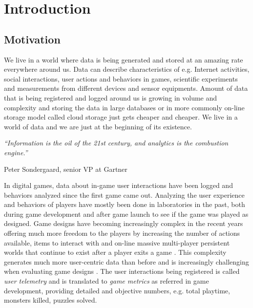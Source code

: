 
\chapter{Introduction} %
\label{Chapter1}

\section{Motivation}
We live in a world where data is being generated and stored at an amazing rate everywhere around us. Data can describe characteristics of e.g. Internet activities, social interactions, user actions and behaviors in games, scientific experiments and measurements from different devices and sensor equipments. Amount of data that is being registered and logged around us is growing in volume and complexity and storing the data in large databases or in more commonly on-line storage model called cloud storage just gets cheaper and cheaper. We live in a world of data and we are just at the beginning of its existence. 

\null
\textit{``Information is the oil of the 21st century, and analytics is the combustion engine.''}

\begin{flushright}
Peter Sondergaard, senior VP at Gartner
\end{flushright}

In digital games, data about in-game user interactions have been logged and behaviors analyzed since the first game came out. Analyzing the user experience and behaviors of players have mostly been done in laboratories in the past, both during game development and after game launch to see if the game was played as designed. Game designs have becoming increasingly complex in the recent years offering much more freedom to the players by increasing the number of actions available, items to interact with and on-line massive multi-player persistent worlds that continue to exist after a player exits a game \citep{Kim:2008Tracking, Drachen:2011Evaluating}. This complexity generates much more user-centric data than before and is increasingly challenging when evaluating game designs \cite{Pagulayan:2002UserDesign, Seif:2013GameAnalytics}. The user interactions being registered is called \textit{user telemetry} and is translated to \textit{game metrics} as referred in game development, providing detailed and objective numbers, e.g. total playtime, monsters killed, puzzles solved.

